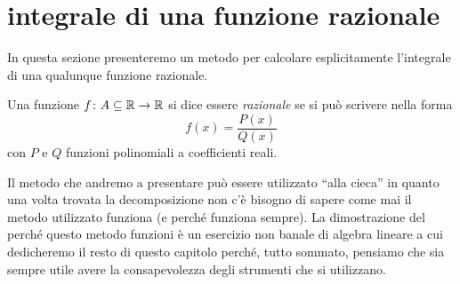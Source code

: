 %
%
%
\section{integrale di una funzione razionale}
%
In questa sezione presenteremo un metodo per
calcolare esplicitamente l'integrale di una qualunque funzione razionale.

\begin{definition}
Una funzione $f\colon A \subseteq \mathbb R \to \mathbb R$
si dice essere \emph{razionale} se si può scrivere nella forma
\[
  f(x) = \frac{P(x)}{Q(x)}
\]
con $P$ e $Q$ funzioni polinomiali a coefficienti reali.
\end{definition}

Il metodo che andremo a presentare può essere utilizzato ``alla cieca'' in
quanto una volta trovata la decomposizione non c'è bisogno di sapere
come mai il metodo utilizzato funziona (e perché funziona sempre).
La dimostrazione del perché questo metodo funzioni è un esercizio non
banale di algebra lineare a cui dedicheremo il resto di questo capitolo
perché, tutto sommato, pensiamo che sia sempre utile avere la consapevolezza degli strumenti che si utilizzano.

